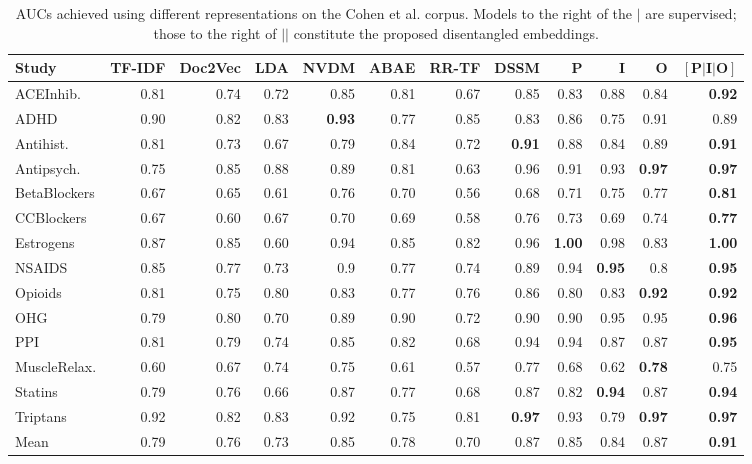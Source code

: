 \documentclass[11pt,a4paper]{article}
\begin{document}
\begin{table}%
\small
\setlength{\tabcolsep}{3pt}
\centering
\begin{tabular}{l r r r r r|r r || r r r r}
Study &  TF-IDF &  Doc2Vec&  LDA &  NVDM &  ABAE&  RR-TF &  DSSM & $\mathbf{P}$ & $\mathbf{I}$ & $\mathbf{O}$ & $\mathbf{[P|I|O]}$ \\ 
\hline
ACEInhib.  & 0.81 & 0.74 & 0.72 & 0.85 & 0.81 & 0.67 & 0.85 & 0.83 & 0.88 & 0.84 &  \textbf{0.92} \\
ADHD  & 0.90 & 0.82 & 0.83 &  \textbf{0.93}  & 0.77 & 0.85 & 0.83 & 0.86 & 0.75 & 0.91 &  0.89 \\ 
Antihist. & 0.81 & 0.73 & 0.67 & 0.79 & 0.84 & 0.72 & \textbf{0.91} & 0.88 & 0.84 & 0.89 &  \textbf{0.91} \\  
Antipsych.  & 0.75 & 0.85 & 0.88 & 0.89 & 0.81 & 0.63 & 0.96 & 0.91 & 0.93 &  \textbf{0.97} &  \textbf{0.97} \\ 
BetaBlockers  & 0.67 & 0.65 & 0.61 & 0.76 & 0.70 & 0.56 & 0.68 & 0.71 & 0.75 & 0.77 &  \textbf{0.81} \\ 
CCBlockers  & 0.67 & 0.60 & 0.67 & 0.70 & 0.69 & 0.58 & 0.76 & 0.73 & 0.69 & 0.74 &  \textbf{0.77} \\ 
Estrogens  & 0.87 & 0.85 & 0.60 & 0.94 & 0.85 & 0.82 & 0.96 &  \textbf{1.00} & 0.98 & 0.83 &  \textbf{1.00} \\ 
NSAIDS  & 0.85 & 0.77 & 0.73 & 0.9 & 0.77 & 0.74 & 0.89 & 0.94 &  \textbf{0.95} & 0.8 &  \textbf{0.95} \\ 
Opioids  & 0.81 & 0.75 & 0.80 & 0.83 & 0.77 & 0.76 & 0.86 & 0.80 & 0.83 &  \textbf{0.92} &  \textbf{0.92} \\ 
OHG  & 0.79 & 0.80 & 0.70 & 0.89 & 0.90 & 0.72 & 0.90 & 0.90 & 0.95 & 0.95 &  \textbf{0.96} \\
PPI  & 0.81 & 0.79 & 0.74 & 0.85 & 0.82 & 0.68 & 0.94 & 0.94 & 0.87 & 0.87 &  \textbf{0.95} \\  
MuscleRelax.  & 0.60 & 0.67 & 0.74 & 0.75 & 0.61 & 0.57 & 0.77 & 0.68 & 0.62 &  \textbf{0.78}&  0.75 \\ 
Statins  & 0.79 & 0.76 & 0.66 & 0.87 & 0.77 & 0.68 & 0.87 & 0.82 &  \textbf{0.94} & 0.87 &  \textbf{0.94} \\  
Triptans  & 0.92 & 0.82 & 0.83 & 0.92 & 0.75 & 0.81 & \textbf{0.97}& 0.93 & 0.79 &  \textbf{0.97}  &  \textbf{0.97} \\  \hline
Mean & 0.79	& 0.76& 	0.73& 	0.85& 	0.78& 	0.70& 	0.87& 	0.85& 	0.84& 	0.87& 	\textbf{0.91}
\end{tabular}
\vspace{-.65em}
\caption{AUCs achieved using different representations on the Cohen et al. corpus. Models to the right of the $\vert$ are supervised; those to the right of $\vert \vert$ constitute the proposed disentangled embeddings. } 
\label{table:cohenauc}
\end{table}
\end{document}
